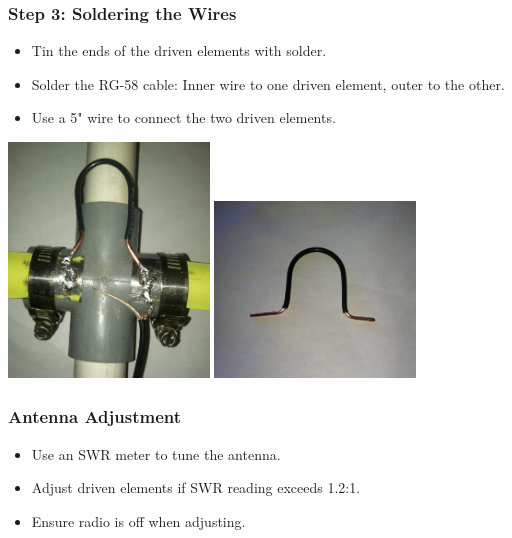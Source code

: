 \documentclass{beamer}
\begin{document}
\begin{frame}
    \frametitle{Step 3: Soldering the Wires}
    \begin{itemize}
        \item Tin the ends of the driven elements with solder.
        \item Solder the RG-58 cable: Inner wire to one driven element, outer to the other.
        \item Use a 5" wire to connect the two driven elements.
    \end{itemize}
    \begin{center}
        \includegraphics[width=0.4\textwidth]{soldering-1.jpg}
        \includegraphics[width=0.4\textwidth]{soldering-2.jpg}
    \end{center}
\end{frame}

\begin{frame}
    \frametitle{Antenna Adjustment} 
    \begin{itemize}
        \item Use an SWR meter to tune the antenna. 
        \item Adjust driven elements if SWR reading exceeds 1.2:1. 
        \item Ensure radio is off when adjusting. 
    \end{itemize} 
\end{frame}
\end{document}
